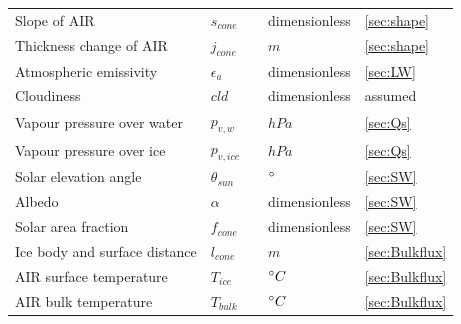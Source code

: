 \begin{table}
\begin{tabular}{lllll}
		Slope of AIR                         & $s_{cone}$       &                                     & dimensionless                 & \ref{sec:shape}                                        \\
		Thickness change of AIR              & $j_{cone}$       &                                     & $m$                           & \ref{sec:shape}                                        \\
		Atmospheric emissivity               & $\epsilon_{a}$   &                                     & dimensionless                 & \ref{sec:LW}                                           \\
		Cloudiness                           & $cld$            &                                     & dimensionless                 & assumed                                                \\
		Vapour pressure over water           & $p_{v,w}$        &                                     & $hPa$                         & \ref{sec:Qs}                                           \\
		Vapour pressure over ice             & $p_{v,ice}$      &                                     & $hPa$                         & \ref{sec:Qs}                                           \\
		Solar elevation angle                & $\theta_{sun}$   &                                     & $^{\circ}$                     & \ref{sec:SW}                                           \\
		Albedo                               & $\alpha$         &                                     & dimensionless                 & \ref{sec:SW}                                           \\
		Solar area fraction                  & $f_{cone}$       &                                     & dimensionless                 & \ref{sec:SW}                                           \\
		Ice body and surface distance        & $l_{cone}$       &                                     & $m$                           & \ref{sec:Bulkflux}                                     \\
		AIR surface temperature              & $T_{ice}$        &                                     & $^{\circ} C$                   & \ref{sec:Bulkflux}                                     \\
		AIR bulk temperature                 & $T_{bulk}$       &                                     & $^{\circ} C$                   & \ref{sec:Bulkflux}                                     \\\midrule

\end{tabular}
\end{table}
